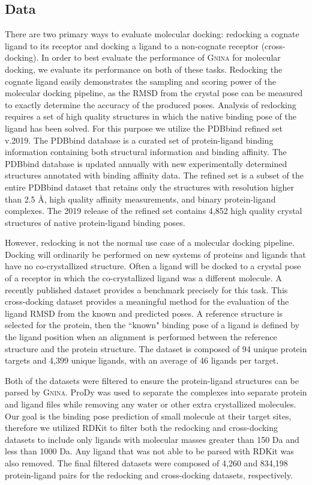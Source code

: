 \documentclass[journal=jcisd8,manuscript=article]{achemso}
\begin{document}
\subsection{Data}
There are two primary ways to evaluate molecular docking: redocking a cognate ligand to its receptor and docking a ligand to a non-cognate receptor (cross-docking). In order to best evaluate the performance of \textsc{Gnina} for molecular docking, we evaluate its performance on both of these tasks. Redocking the cognate ligand easily demonstrates the sampling and scoring power of the molecular docking pipeline, as the RMSD from the crystal pose can be measured to exactly determine the accuracy of the produced poses. Analysis of redocking requires a set of high quality structures in which the native binding pose of the ligand has been solved. For this purpose we utilize the PDBbind refined set v.2019\cite{liu2017forging}. The PDBbind database is a curated set of protein-ligand binding information containing both structural information and binding affinity. The PDBbind database is updated annually with new experimentally determined structures annotated with binding affinity data. The refined set is a subset of the entire PDBbind dataset that retains only the structures with resolution higher than 2.5 \AA, high quality affinity measurements, and binary protein-ligand complexes. The 2019 release of the refined set contains 4,852 high quality crystal structures of native protein-ligand binding poses. 

However, redocking is not the normal use case of a molecular docking pipeline. Docking will ordinarily be performed on new systems of proteins and ligands that have no co-crystallized structure. Often a ligand will be docked to a crystal pose of a receptor in which the co-crystallized ligand was a different molecule. A recently published dataset provides a benchmark precisely for this task\cite{wierbowski2020cross}. This cross-docking dataset provides a meaningful method for the evaluation of the ligand RMSD from the known and predicted poses. A reference structure is selected for the protein, then the ``known" binding pose of a ligand is defined by the ligand position when an alignment is performed between the reference structure and the protein structure. The dataset is composed of 94 unique protein targets and 4,399 unique ligands, with an average of 46 ligands per target. 

Both of the datasets were filtered to ensure the protein-ligand structures can be parsed by \textsc{Gnina}. ProDy\cite{bakan2011prody} was used to separate the complexes into separate protein and ligand files while removing any water or other extra crystallized molecules. Our goal is the binding pose prediction of small molecule at their target sites, therefore we utilized RDKit\cite{rdkit} to filter both the redocking and cross-docking datasets to include only ligands with molecular masses greater than 150 Da and less than 1000 Da. Any ligand that was not able to be parsed with RDKit was also removed. The final filtered datasets were composed of 4,260 and 834,198 protein-ligand pairs for the redocking and cross-docking datasets, respectively.
\end{document}
